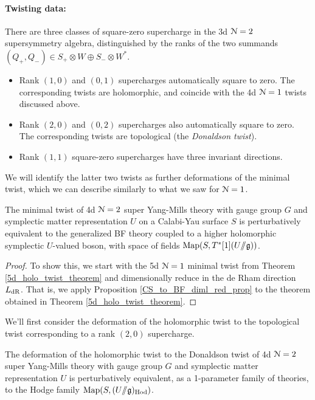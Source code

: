 \documentclass[10pt, oneside]{article}
\newcommand{\ham}{/\!\!/}
\begin{document}
\vspace{-10pt}
\paragraph{Twisting data:}
There are three classes of square-zero supercharge in the 3d $\mathcal{N}=2$ supersymmetry algebra, distinguished by the ranks of the two summands $(Q_+,Q_-) \in S_+ \otimes W \oplus S_- \otimes W^*$.
\begin{itemize}
 \item Rank $(1,0)$ and $(0,1)$ supercharges automatically square to zero.  The corresponding twists are holomorphic, and coincide with the 4d $\mathcal{N}=1$ twists discussed above.
 \item Rank $(2,0)$ and $(0,2)$ supercharges also automatically square to zero. The corresponding twists are topological (the \emph{Donaldson twist}).
 \item Rank $(1,1)$ square-zero supercharges have three invariant directions.
\end{itemize}

We will identify the latter two twists as further deformations of the minimal twist, which we can describe similarly to what we saw for $\mathcal{N}=1$.

\begin{theorem} \label{4d_2_holo_twist_thm}
The minimal twist of 4d $\mathcal{N}=2$ super Yang-Mills theory with gauge group $G$ and symplectic matter representation $U$ on a Calabi-Yau surface $S$ is perturbatively equivalent to the generalized BF theory coupled to a higher holomorphic symplectic $U$-valued boson, with space of fields $\mr{Map}(S, T^*[1](U\ham \gg))$.
\end{theorem}

\begin{proof}
To show this, we start with the 5d $\mathcal{N}=1$ minimal twist from Theorem \ref{5d_holo_twist_theorem} and dimensionally reduce in the de Rham direction $L_{\mathrm{dR}}$.  That is, we apply Proposition \ref{CS_to_BF_diml_red_prop} to the theorem obtained in Theorem \ref{5d_holo_twist_theorem}.
\end{proof}

We'll first consider the deformation of the holomorphic twist to the topological twist corresponding to a rank $(2,0)$ supercharge.

\begin{theorem} \label{4d_Donaldson_twist_thm}
The deformation of the holomorphic twist to the Donaldson twist of 4d $\mathcal{N}=2$ super Yang-Mills theory with gauge group $G$ and symplectic matter representation $U$ is perturbatively equivalent, as a 1-parameter family of theories, to the Hodge family $\mr{Map}(S, (U\ham \gg)_{\mr{Hod}})$.  
\end{theorem}
\end{document}
